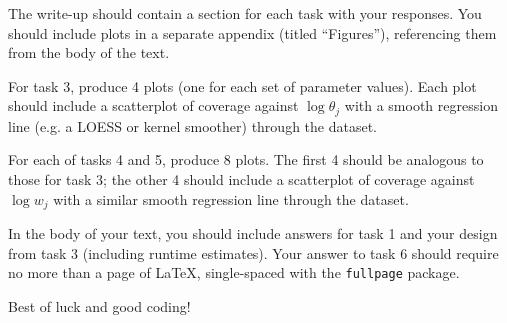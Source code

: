 \documentclass[11pt]{article}
\begin{document}
The write-up should contain a section for each task with your responses. You should include plots in a separate appendix (titled ``Figures''), referencing them from the body of the text.

For task 3, produce 4 plots (one for each set of parameter values). Each plot should include a scatterplot of coverage against $\log \theta_j$ with a smooth regression line (e.g. a LOESS or kernel smoother) through the dataset.

For each of tasks 4 and 5, produce 8 plots. The first 4 should be analogous to those for task 3; the other 4 should include a scatterplot of coverage against $\log w_j$ with a similar smooth regression line through the dataset.

In the body of your text, you should include answers for task 1 and your design from task 3 (including runtime estimates). Your answer to task 6 should require no more than a page of \LaTeX, single-spaced with the \verb+fullpage+ package.

Best of luck and good coding!
\end{document}
